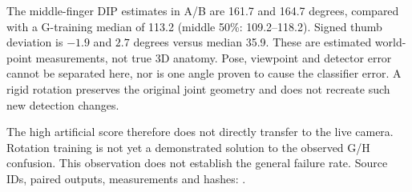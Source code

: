The middle-finger DIP estimates in A/B are 161.7 and 164.7 degrees, compared with a G-training median of 113.2 (middle 50\%: 109.2--118.2). Signed thumb deviation is $-1.9$ and $2.7$ degrees versus median 35.9. These are estimated world-point measurements, not true 3D anatomy. Pose, viewpoint and detector error cannot be separated here, nor is one angle proven to cause the classifier error. A rigid rotation preserves the original joint geometry and does not recreate such new detection changes.

The high artificial score therefore does not directly transfer to the live camera. Rotation training is not yet a demonstrated solution to the observed G/H confusion. This observation does not establish the general failure rate. Source IDs, paired outputs, measurements and hashes: .
